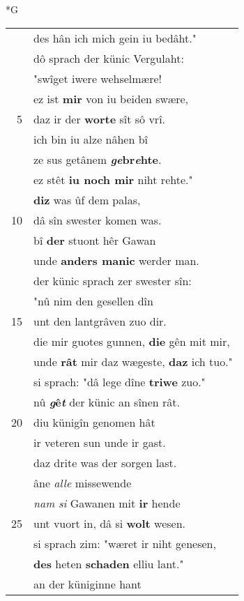 \documentclass[8pt,a4paper,notitlepage]{article}
\begin{document}
\newpage
\begin{table}[ht]
\begin{minipage}[t]{0.5\linewidth}
\small
\begin{center}*G
\end{center}
\begin{tabular}{rl}
 & des hân ich mich gein iu bedâht."\\ 
 & dô sprach der künic Vergulaht:\\ 
 & "swîget iwere wehselmære!\\ 
 & ez ist \textbf{mir} von iu beiden swære,\\ 
5 & daz ir der \textbf{worte} sît sô vrî.\\ 
 & ich bin iu alze nâhen bî\\ 
 & ze sus getânem \textbf{\textit{ge}br\textit{e}hte}.\\ 
 & ez stêt \textbf{iu noch mir} niht rehte."\\ 
 & \textbf{diz} was ûf dem palas,\\ 
10 & dâ sîn swester komen was.\\ 
 & bî \textbf{der} stuont hêr Gawan\\ 
 & unde \textbf{anders manic} werder man.\\ 
 & der künic sprach zer swester sîn:\\ 
 & "nû nim den gesellen dîn\\ 
15 & unt den lantgrâven zuo dir.\\ 
 & die mir guotes gunnen, \textbf{die} gên mit mir,\\ 
 & unde \textbf{rât} mir daz wægeste, \textbf{daz} ich tuo."\\ 
 & si sprach: "dâ lege dîne \textbf{triwe} zuo."\\ 
 & nû \textbf{\textit{g}ê\textit{t}} der künic an sînen rât.\\ 
20 & diu künigîn genomen hât\\ 
 & ir veteren sun unde ir gast.\\ 
 & daz drite was der sorgen last.\\ 
 & âne \textit{alle} missewende\\ 
 & \textit{nam si} Gawanen mit \textbf{ir} hende\\ 
25 & unt vuort in, dâ si \textbf{wolt} wesen.\\ 
 & si sprach zim: "wæret ir niht genesen,\\ 
 & \textbf{des} heten \textbf{schaden} elliu lant."\\ 
 & an der küniginne hant\\ 

\end{tabular}
\end{minipage}
\end{table}
\end{document}
